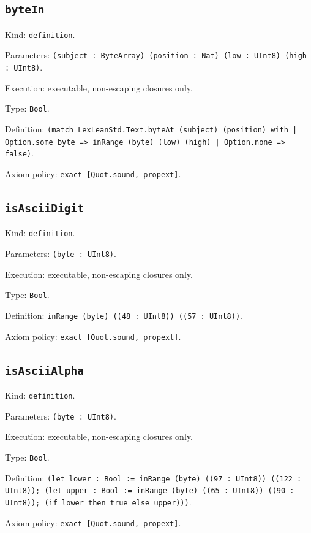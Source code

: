 \documentclass[11pt]{article}
\begin{document}
\subsection*{\texttt{byteIn}}
\noindent Kind: \texttt{definition}.\par
\noindent Parameters: \texttt{(subject : ByteArray) (position : Nat) (low : UInt8) (high : UInt8)}.\par
\noindent Execution: executable, non-escaping closures only.\par
\noindent Type: \texttt{Bool}.\par
\noindent Definition: \texttt{(match LexLeanStd.Text.byteAt (subject) (position) with | Option.some byte => inRange (byte) (low) (high) | Option.none => false)}.\par
\noindent Axiom policy: \texttt{exact [Quot.sound, propext]}.\par
\subsection*{\texttt{isAsciiDigit}}
\noindent Kind: \texttt{definition}.\par
\noindent Parameters: \texttt{(byte : UInt8)}.\par
\noindent Execution: executable, non-escaping closures only.\par
\noindent Type: \texttt{Bool}.\par
\noindent Definition: \texttt{inRange (byte) ((48 : UInt8)) ((57 : UInt8))}.\par
\noindent Axiom policy: \texttt{exact [Quot.sound, propext]}.\par
\subsection*{\texttt{isAsciiAlpha}}
\noindent Kind: \texttt{definition}.\par
\noindent Parameters: \texttt{(byte : UInt8)}.\par
\noindent Execution: executable, non-escaping closures only.\par
\noindent Type: \texttt{Bool}.\par
\noindent Definition: \texttt{(let lower : Bool := inRange (byte) ((97 : UInt8)) ((122 : UInt8)); (let upper : Bool := inRange (byte) ((65 : UInt8)) ((90 : UInt8)); (if lower then true else upper)))}.\par
\noindent Axiom policy: \texttt{exact [Quot.sound, propext]}.\par
\end{document}
